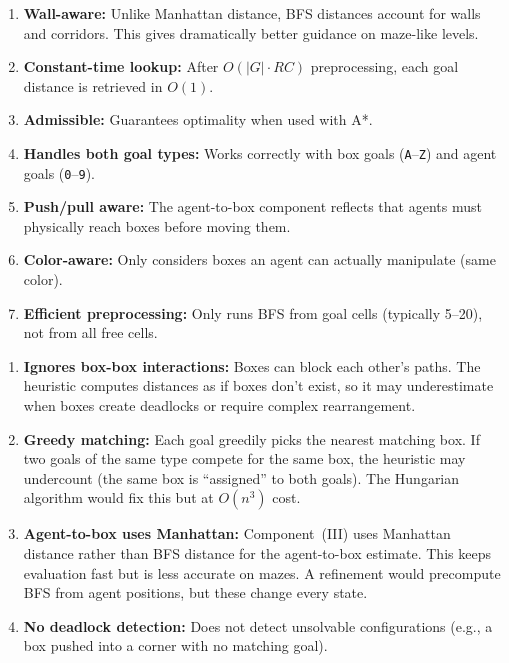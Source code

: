 \documentclass[11pt, a4paper]{article}
\begin{document}
\begin{propertybox}[Strengths]
\begin{enumerate}[leftmargin=1.5em]
    \item \textbf{Wall-aware:} Unlike Manhattan distance, BFS distances account for walls and corridors. This gives dramatically better guidance on maze-like levels.
    \item \textbf{Constant-time lookup:} After $O(|G| \cdot RC)$ preprocessing, each goal distance is retrieved in $O(1)$.
    \item \textbf{Admissible:} Guarantees optimality when used with A*.
    \item \textbf{Handles both goal types:} Works correctly with box goals (\texttt{A}--\texttt{Z}) and agent goals (\texttt{0}--\texttt{9}).
    \item \textbf{Push/pull aware:} The agent-to-box component reflects that agents must physically reach boxes before moving them.
    \item \textbf{Color-aware:} Only considers boxes an agent can actually manipulate (same color).
    \item \textbf{Efficient preprocessing:} Only runs BFS from goal cells (typically 5--20), not from all free cells.
\end{enumerate}
\end{propertybox}

\begin{warningbox}[Weaknesses]
\begin{enumerate}[leftmargin=1.5em]
    \item \textbf{Ignores box-box interactions:} Boxes can block each other's paths. The heuristic computes distances as if boxes don't exist, so it may underestimate when boxes create deadlocks or require complex rearrangement.
    \item \textbf{Greedy matching:} Each goal greedily picks the nearest matching box. If two goals of the same type compete for the same box, the heuristic may undercount (the same box is ``assigned'' to both goals). The Hungarian algorithm would fix this but at $O(n^3)$ cost.
    \item \textbf{Agent-to-box uses Manhattan:} Component~(III) uses Manhattan distance rather than BFS distance for the agent-to-box estimate. This keeps evaluation fast but is less accurate on mazes. A refinement would precompute BFS from agent positions, but these change every state.
    \item \textbf{No deadlock detection:} Does not detect unsolvable configurations (e.g., a box pushed into a corner with no matching goal).
\end{enumerate}
\end{warningbox}
\end{document}
